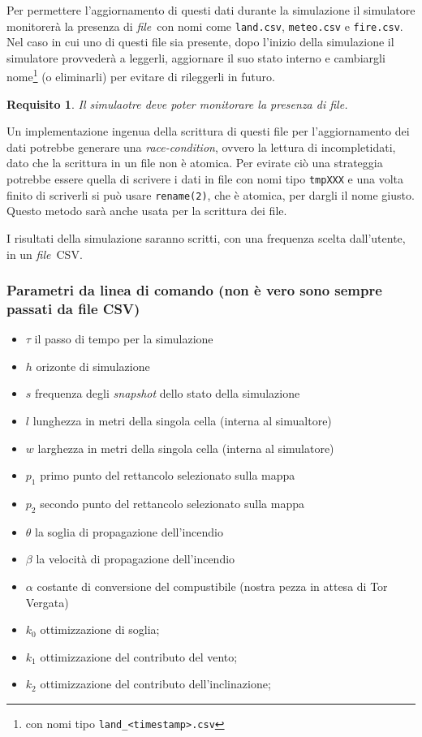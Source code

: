 \documentclass[draft]{article}
\newcommand{\file}{\textit{file}}
\newtheorem{requirement}{Requisito}
\begin{document}
Per permettere l'aggiornamento di questi dati durante la simulazione il
simulatore monitorerà la presenza di \file\ con nomi come \texttt{land.csv},
\texttt{meteo.csv} e \texttt{fire.csv}. Nel caso in cui uno di questi file sia
presente, dopo l'inizio della simulazione il simulatore provvederà a leggerli,
aggiornare il suo stato interno e cambiargli nome\footnote{con nomi tipo
\texttt{land\_<timestamp>.csv}} (o eliminarli) per evitare di rileggerli in
futuro.

\begin{requirement}
Il simulaotre deve poter monitorare la presenza di file.
\end{requirement}

Un implementazione ingenua della scrittura di questi file per l'aggiornamento
dei dati potrebbe generare una \textit{race-condition}, ovvero la lettura di
incompletidati, dato che la scrittura in un file non è atomica. Per evirate ciò
una strateggia potrebbe essere quella di scrivere i dati in file con nomi tipo
\texttt{tmpXXX} e una volta finito di scriverli si può usare \texttt{rename(2)},
che è atomica, per dargli il nome giusto. Questo metodo sarà anche usata per la
scrittura dei file.

I risultati della simulazione saranno scritti, con una frequenza scelta
dall'utente, in un \file\ CSV.

\subsubsection{Parametri da linea di comando (non è vero sono sempre passati da
file CSV)}

\begin{itemize}
\item $\tau$ il passo di tempo per la simulazione
\item $h$ orizonte di simulazione
\item $s$ frequenza degli \textit{snapshot} dello stato della simulazione
\item $l$ lunghezza in metri della singola cella (interna al simualtore)
\item $w$ larghezza in metri della singola cella (interna al simulatore)
\item $p_1$ primo punto del rettancolo selezionato sulla mappa
\item $p_2$ secondo punto del rettancolo selezionato sulla mappa
\item $\theta$ la soglia di propagazione dell'incendio
\item $\beta$ la velocità di propagazione dell'incendio
\item $\alpha$ costante di conversione del compustibile (nostra pezza in attesa
di Tor Vergata)
\item $k_0$ ottimizzazione di soglia;
\item $k_1$ ottimizzazione del contributo del vento;
\item $k_2$ ottimizzazione del contributo dell'inclinazione;
\end{itemize}
\end{document}
